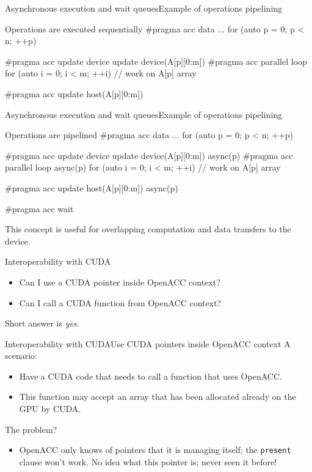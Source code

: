 \documentclass[12pt,aspectratio=169]{beamer}
\begin{document}
\begin{frame}[fragile]{Asynchronous execution and wait queues}{Example of operations pipelining}
  \begin{Cpplisting}{Operations are executed sequentially}
#pragma acc data ...
for (auto p = 0; p < n; ++p) {
    #pragma acc update device update device(A[p][0:m])
    #pragma acc parallel loop
    for (auto i = 0; i < m; ++i) {
        // work on A[p] array
    }

    #pragma acc update host(A[p][0:m])
}
  \end{Cpplisting}
\end{frame}

\begin{frame}[fragile]{Asynchronous execution and wait queues}{Example of operations pipelining}
  \begin{Cpplisting}{Operations are pipelined}
#pragma acc data ...
for (auto p = 0; p < n; ++p) {
    #pragma acc update device update device(A[p][0:m]) async(p)
    #pragma acc parallel loop async(p)
    for (auto i = 0; i < m; ++i) {
        // work on A[p] array
    }

    #pragma acc update host(A[p][0:m]) async(p)
}
#pragma acc wait
  \end{Cpplisting}
  \vfill
  This concept is useful for overlapping computation and data transfers to the device.
\end{frame}

\begin{frame}{Interoperability with CUDA}
  \large
  \begin{itemize}
  \item Can I use a CUDA pointer inside OpenACC context?
    \vspace\baselineskip
  \item Can I call a CUDA function from OpenACC context?
  \end{itemize}
  \vfill
  Short answer is \emph{yes}.
\end{frame}

\begin{frame}{Interoperability with CUDA}{Use CUDA pointers inside OpenACC context}
  A scenario:
  \begin{itemize}
  \item Have a CUDA code that needs to call a function that uses OpenACC.
  \item This function may accept an array that has been allocated already on the GPU by CUDA.
  \end{itemize}
  \vfill
  The problem?
  \begin{itemize}
  \item OpenACC only knows of pointers that it is managing itself; the \texttt{present} clause won't work. No idea what this pointer is; never seen it before!
  \end{itemize}
\end{frame}
\end{document}
